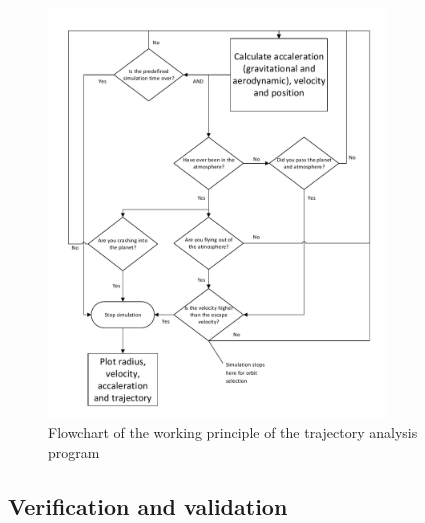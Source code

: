 \begin{figure}[H]
\centering
\hspace{-23mm}
\includegraphics[width = 0.8\textwidth]{Figure/astro_tool.pdf}
\vspace{-5mm}
\caption{Flowchart of the working principle of the trajectory analysis program}
\label{fig:traj_flow}
\end{figure}

\subsection{Verification and validation}